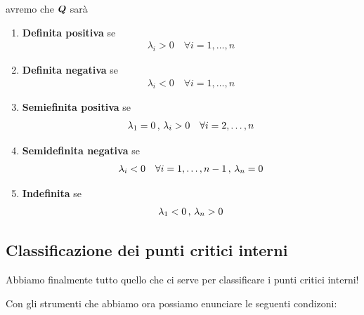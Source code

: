 \begin{enumerate}
	avremo che $\boldsymbol{Q}$ sarà
	\begin{enumerate}
		\item \textbf{Definita positiva} se
		\begin{align}
			\lambda_i >0 \quad \forall i=1,\dots, n
		\end{align}
		\item \textbf{Definita negativa} se
		\begin{align}
			\lambda_i <0 \quad \forall i=1,\dots, n
		\end{align}
		\item \textbf{Semiefinita positiva} se
		\begin{align}
			\lambda_1=0 \, , \, \lambda_i > 0 \quad \forall i=2,\dots, n 
		\end{align}
		\item \textbf{Semidefinita negativa} se
		\begin{align}
			\lambda_i < 0 \quad \forall i=1,\dots, n-1 \, , \, \lambda_n=0
		\end{align}
		\item \textbf{Indefinita} se
		\begin{align}
			\lambda_1<0 \, , \, \lambda_n>0
		\end{align}
	\end{enumerate}
\end{enumerate}

\subsection{Classificazione dei punti critici interni}

Abbiamo finalmente tutto quello che ci serve per classificare i punti critici interni!

Con gli strumenti che abbiamo ora possiamo enunciare le seguenti condizoni:

